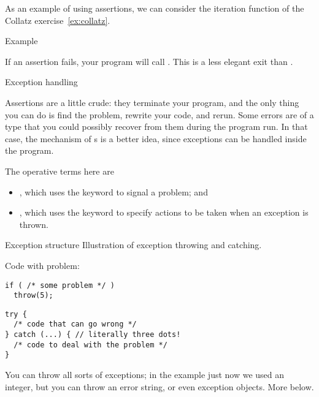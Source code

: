 As an example of using assertions, we can consider the iteration function
of the Collatz exercise~\ref{ex:collatz}.

\begin{block}{Example}
  \label{sl:collatzassert}
\end{block}

\begin{remark}
  If an assertion fails, your program
  will call .
  This is a less elegant exit than .
\end{remark}

 {Exception handling}
\label{sec:exception}

Assertions are a little crude: they terminate your program,
and the only thing you can do is find the problem,
rewrite your code, and rerun.
Some errors are of a type that you could possibly recover from them
during the program run.
In that case, the mechanism of s is a better idea,
since exceptions can be handled inside the program.

The operative terms here are
\begin{itemize}
\item {}, which uses the 
  keyword to signal a problem; and
\item {}, which uses the 
  keyword to specify actions to be taken when an exception is thrown.
\end{itemize}

\begin{block}{Exception structure}
  \label{sl:except-structure}
  Illustration of exception throwing and catching.
\begin{multicols}{2}
Code with problem:
\begin{lstlisting}
if ( /* some problem */ )
  throw(5); 
\end{lstlisting}
\vfill\columnbreak
\begin{lstlisting}
try {
  /* code that can go wrong */
} catch (...) { // literally three dots!
  /* code to deal with the problem */
}
\end{lstlisting}
\end{multicols}
\end{block}

You can throw all sorts of exceptions; in the example just now we used
an integer, but you can throw an error string, or even exception objects.
More below.

